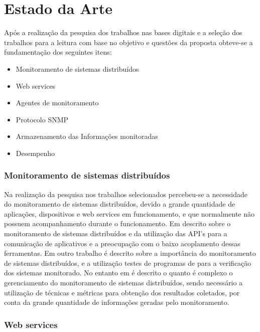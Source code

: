 \section{Estado da Arte}
Após a realização da pesquisa dos trabalhos nas bases digitais e a seleção dos trabalhos para a leitura com base no objetivo e questões da proposta obteve-se a fundamentação dos seguintes itens:
\begin{itemize}
\item Monitoramento de sistemas distribuídos
\item Web services
\item Agentes de monitoramento
\item Protocolo SNMP
\item Armazenamento das Informações monitoradas
\item Desempenho
\end{itemize}

\subsubsection{Monitoramento de sistemas distribuídos}
Na realização da pesquisa nos trabalhos selecionados percebeu-se a necessidade do monitoramento de sistemas distribuídos, devido a grande quantidade de  aplicações, dispositivos e web services em funcionamento, e que normalmente não possuem acompanhamento durante o funcionamento. Em \cite{cirstoiu2007monitoring} descrito sobre o monitoramento de sistemas distribuídos e da utilização das API's para a comunicação de aplicativos e a preocupação com o baixo acoplamento dessas ferramentas. Em outro trabalho \cite{joyce1987monitoring} é descrito sobre a importância do monitoramento de sistemas distribuídos, e a utilização testes de programas de para a verificação dos sistemas monitorado. No entanto em \cite{abdu1996monitoring} é descrito o quanto é complexo o gerenciamento do monitoramento de sistemas distribuídos, sendo necessário a utilização de técnicas e métricas para obtenção dos resultados coletados, por conta da grande quantidade de informações geradas pelo monitoramento.  

\subsubsection{Web services}

